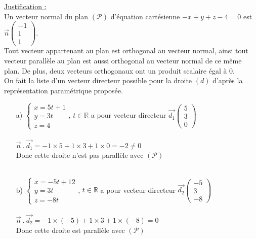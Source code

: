 \documentclass[a4paper, 12pt]{article}
\begin{document}
\noindent
\underline{Justification :}
\\
Un vecteur normal du plan $(\mathcal{P})$ d'équation cartésienne $ - x + y + z - 4 = 0$ est $\vec{n}\begin{pmatrix}-1 \\ 1 \\ 1\end{pmatrix}$.
\\
Tout vecteur appartenant au plan est orthogonal au vecteur normal, ainsi tout vecteur parallèle au plan est aussi orthogonal au vecteur normal de ce même plan.
De plus, deux vecteurs orthogonaux ont un produit scalaire égal à 0.
\\
On fait la liste d'un vecteur directeur possible pour la droite $(d)$ d'après la représentation paramétrique proposée. 
\begin{itemize}
    \item[a)] $\begin{cases} x = 5t + 1 \\ y = 3t \\ z = 4 \end{cases}$, $t \in \mathbb{R}$ a pour vecteur directeur $\vec{d_1}\begin{pmatrix} 5 \\ 3 \\ 0 \end{pmatrix}$ \\ \\ 
        $\vec{n}\ .\ \vec{d_1} = -1 \times 5 + 1 \times 3 + 1 \times 0 = -2 \neq 0$ \\ 
        Donc cette droite n'est pas parallèle avec $(\mathcal{P})$ \\ \\

    \item[b)] $\begin{cases} x = -5t +12 \\ y = 3t \\ z = -8t \end{cases}$, $t \in \mathbb{R}$ a pour vecteur directeur $\vec{d_2}\begin{pmatrix} -5 \\ 3 \\ -8 \end{pmatrix}$ \\ \\ 
        $\vec{n}\ .\ \vec{d_2} = -1 \times (-5) + 1 \times 3 + 1 \times (-8) = 0$ \\ 
        Donc cette droite est parallèle avec $(\mathcal{P})$ \\ \\


\end{itemize}
\end{document}
